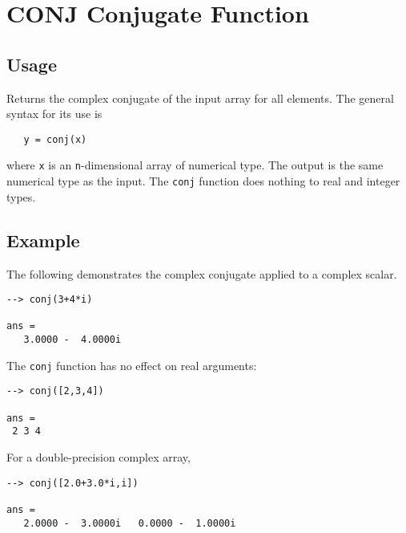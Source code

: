\section{CONJ Conjugate Function}

\subsection{Usage}

Returns the complex conjugate of the input array for all elements.  The 
general syntax for its use is
\begin{verbatim}
   y = conj(x)
\end{verbatim}
where \verb|x| is an \verb|n|-dimensional array of numerical type.  The output 
is the same numerical type as the input.  The \verb|conj| function does
nothing to real and integer types.
\subsection{Example}

The following demonstrates the complex conjugate applied to a complex scalar.
\begin{verbatim}
--> conj(3+4*i)

ans = 
   3.0000 -  4.0000i 
\end{verbatim}
The \verb|conj| function has no effect on real arguments:
\begin{verbatim}
--> conj([2,3,4])

ans = 
 2 3 4 
\end{verbatim}
For a double-precision complex array,
\begin{verbatim}
--> conj([2.0+3.0*i,i])

ans = 
   2.0000 -  3.0000i   0.0000 -  1.0000i 
\end{verbatim}
